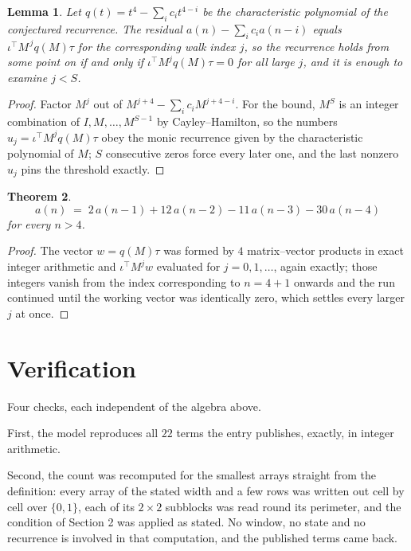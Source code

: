 \documentclass[11pt,a4paper]{article}
\theoremstyle{plain}
\newtheorem{theorem}{Theorem}
\newtheorem{lemma}[theorem]{Lemma}
\theoremstyle{definition}
\begin{document}
\begin{lemma}\label{lem:crit}
Let $q(t)=t^{4}-\sum_i c_it^{4-i}$ be the characteristic polynomial of the
conjectured recurrence. The residual $a(n)-\sum_ic_ia(n-i)$ equals
$\iota^{\!\top}M^{\,j}q(M)\tau$ for the corresponding walk index $j$, so the recurrence
holds from some point on if and only if $\iota^{\!\top}M^{j}q(M)\tau=0$ for all large $j$,
and it is enough to examine $j<S$.
\end{lemma}

\begin{proof}
Factor $M^{j}$ out of $M^{j+4}-\sum_ic_iM^{j+4-i}$. For the bound, $M^{S}$
is an integer combination of $I,M,\dots,M^{S-1}$ by Cayley--Hamilton, so the numbers
$u_j=\iota^{\!\top}M^{j}q(M)\tau$ obey the monic recurrence given by the characteristic
polynomial of $M$; $S$ consecutive zeros force every later one, and the last nonzero $u_j$
pins the threshold exactly.
\end{proof}

\begin{theorem}
\[
a(n)\;=\;2\,a(n-1) + 12\,a(n-2) - 11\,a(n-3) - 30\,a(n-4)
\]
for every $n>4$.
\end{theorem}

\begin{proof}
The vector $w=q(M)\tau$ was formed by $4$ matrix--vector products in exact integer
arithmetic and $\iota^{\!\top}M^{j}w$ evaluated for $j=0,1,\dots$, again exactly; those
integers vanish from the index corresponding to $n=4+1$ onwards and the run continued
until the working vector was identically zero, which settles every larger $j$ at once.
\end{proof}

\section{Verification}

Four checks, each independent of the algebra above.

First, the model reproduces all $22$ terms the entry publishes, exactly, in integer
arithmetic.

Second, the count was recomputed for the smallest arrays straight from the definition: every
array of the stated width and a few rows was written out cell by cell over $\{0,1\}$, each of
its $2\times2$ subblocks was read round its perimeter, and the condition of Section 2 was
applied as stated. No window, no state and no recurrence is involved in that computation, and
the published terms came back.
\end{document}
